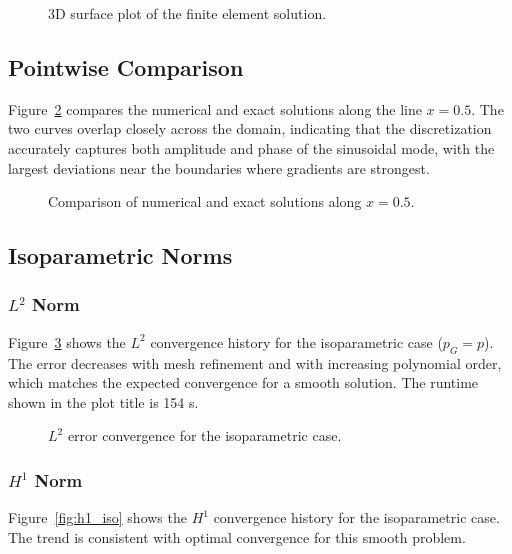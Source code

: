 \documentclass[12pt]{article}
\begin{document}
\begin{figure}[htbp]
\centering

\caption{3D surface plot of the finite element solution.}
\label{fig:uh_surface}
\end{figure}

\clearpage

\subsection{Pointwise Comparison}
Figure~\ref{fig:line_compare} compares the numerical and exact solutions along the line $x=0.5$. The two curves overlap closely across the domain, indicating that the discretization accurately captures both amplitude and phase of the sinusoidal mode, with the largest deviations near the boundaries where gradients are strongest.

\begin{figure}[htbp]
\centering

\caption{Comparison of numerical and exact solutions along $x=0.5$.}
\label{fig:line_compare}
\end{figure}

\clearpage

\subsection{Isoparametric Norms}
\subsubsection{$L^2$ Norm}
Figure~\ref{fig:l2_iso} shows the $L^2$ convergence history for the isoparametric case ($p_G=p$). The error decreases with mesh refinement and with increasing polynomial order, which matches the expected convergence for a smooth solution. The runtime shown in the plot title is 154 s.

\begin{figure}[htbp]
\centering

\caption{$L^2$ error convergence for the isoparametric case.}
\label{fig:l2_iso}
\end{figure}

\clearpage

\subsubsection{$H^1$ Norm}
Figure~\ref{fig:h1_iso} shows the $H^1$ convergence history for the isoparametric case. The trend is consistent with optimal convergence for this smooth problem.
\end{document}
